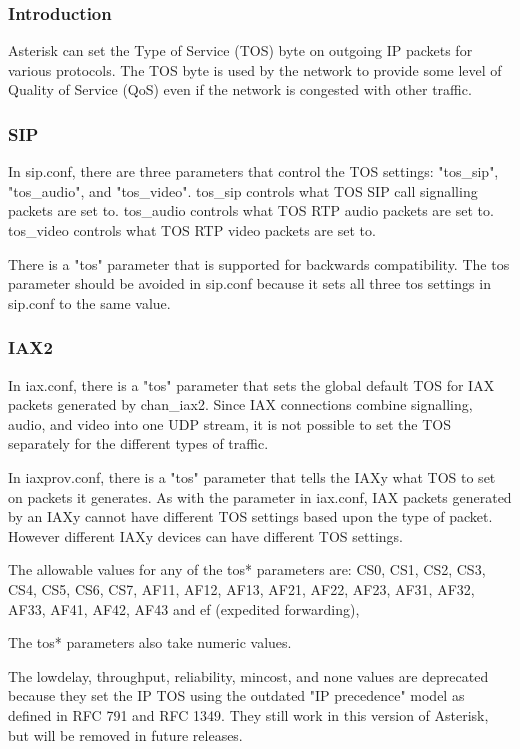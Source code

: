 \subsubsection{Introduction}

Asterisk can set the Type of Service (TOS) byte on outgoing IP packets
for various protocols.  The TOS byte is used by the network to provide
some level of Quality of Service (QoS) even if the network is
congested with other traffic. 

\subsubsection{SIP}

In sip.conf, there are three parameters that control the TOS settings:
"tos\_sip", "tos\_audio", and "tos\_video".  tos\_sip controls what TOS SIP call
signalling packets are set to.  tos\_audio controls what TOS RTP audio
packets are set to.  tos\_video controls what TOS RTP video packets are
set to.  

There is a "tos" parameter that is supported for backwards
compatibility.  The tos parameter should be avoided in sip.conf
because it sets all three tos settings in sip.conf to the same value.

\subsubsection{IAX2}
In iax.conf, there is a "tos" parameter that sets the global default TOS
for IAX packets generated by chan\_iax2.  Since IAX connections combine
signalling, audio, and video into one UDP stream, it is not possible
to set the TOS separately for the different types of traffic.

In iaxprov.conf, there is a "tos" parameter that tells the IAXy what TOS
to set on packets it generates.  As with the parameter in iax.conf,
IAX packets generated by an IAXy cannot have different TOS settings
based upon the type of packet.  However different IAXy devices can
have different TOS settings.

The allowable values for any of the tos* parameters are:
CS0, CS1, CS2, CS3, CS4, CS5, CS6, CS7, AF11, AF12, AF13,
AF21, AF22, AF23, AF31, AF32, AF33, AF41, AF42, AF43 and
ef (expedited forwarding),

The tos* parameters also take numeric values.

The lowdelay, throughput, reliability, mincost, and none values are
deprecated because they set the IP TOS using the outdated "IP
precedence" model as defined in RFC 791 and RFC 1349. They still
work in this version of Asterisk, but will be removed in future releases.

